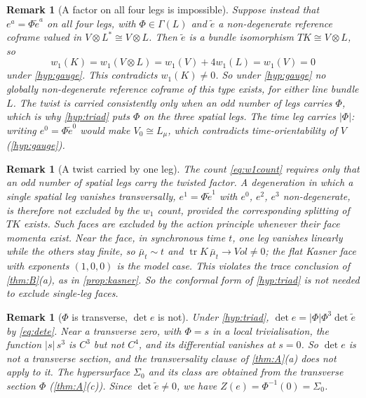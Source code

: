 \documentclass[11pt]{article}
\theoremstyle{canonmath}
\newtheorem{remark}[theorem]{Remark}
\theoremstyle{canonpostulate}
\theoremstyle{canonproposition}
\theoremstyle{canonmath}
\theoremstyle{canonproposition}
\providecommand{\Lmu}{\mathcal{L}_\mu}
\providecommand{\Vb}{\mathcal{V}}
\providecommand{\Klein}{\mathcal{K}}
\def\mathrm#1{#1}%
\def\mathcal#1{#1}%
\begin{document}
\begin{remark}[A factor on all four legs is impossible]\label{rem:fourlegs}
Suppose instead that $e^a = \Phi\tilde{e}^a$ on all four legs, with $\Phi\in\Gamma(L)$ and $\tilde e$ a non-degenerate reference coframe valued in $\Vb\otimes L^*\cong\Vb\otimes L$. Then $\tilde e$ is a bundle isomorphism $T\Klein\cong\Vb\otimes L$, so
\[
w_1(\Klein) = w_1(\Vb\otimes L) = w_1(\Vb) + 4w_1(L) = w_1(\Vb) = 0
\]
under \ref{hyp:gauge}. This contradicts $w_1(\Klein)\neq0$. So under \ref{hyp:gauge} no globally non-degenerate reference coframe of this type exists, for either line bundle $L$. The twist is carried consistently only when an odd number of legs carries $\Phi$, which is why \ref{hyp:triad} puts $\Phi$ on the three spatial legs. The time leg carries $|\Phi|$: writing $e^0 = \Phi\tilde{e}^0$ would make $\Vb_0 \cong \Lmu$, which contradicts time-orientability of $\Vb$ (\ref{hyp:gauge}).
\end{remark}

\begin{remark}[A twist carried by one leg]\label{rem:oddleg}
The count \eqref{eq:w1count} requires only that an odd number of spatial legs carry the twisted factor. A degeneration in which a single spatial leg vanishes transversally, $e^1 = \Phi\tilde e^1$ with $e^0$, $e^2$, $e^3$ non-degenerate, is therefore not excluded by the $w_1$ count, provided the corresponding splitting of $T\Klein$ exists. Such faces are excluded by the action principle whenever their face momenta exist. Near the face, in synchronous time $t$, one leg vanishes linearly while the others stay finite, so $\bar\mu_t\sim t$ and $\operatorname{tr}K\,\bar\mu_t\to\mathrm{Vol}\neq0$; the flat Kasner face with exponents $(1,0,0)$ is the model case. This violates the trace conclusion of \cref{thm:B}(a), as in \cref{prop:kasner}. So the conformal form of \ref{hyp:triad} is not needed to exclude single-leg faces.
\end{remark}

\begin{remark}[$\Phi$ is transverse, $\det e$ is not]\label{rem:detnontransverse}
Under \ref{hyp:triad}, $\det e = |\Phi|\Phi^3\det\tilde e$ by \eqref{eq:dete}. Near a transverse zero, with $\Phi = s$ in a local trivialisation, the function $|s|\,s^3$ is $C^3$ but not $C^4$, and its differential vanishes at $s=0$. So $\det e$ is not a transverse section, and the transversality clause of \cref{thm:A}(a) does not apply to it. The hypersurface $\Sigma_0$ and its class are obtained from the transverse section $\Phi$ (\cref{thm:A}(c)). Since $\det\tilde e\neq0$, we have $Z(e) = \Phi^{-1}(0) = \Sigma_0$.
\end{remark}
\end{document}
